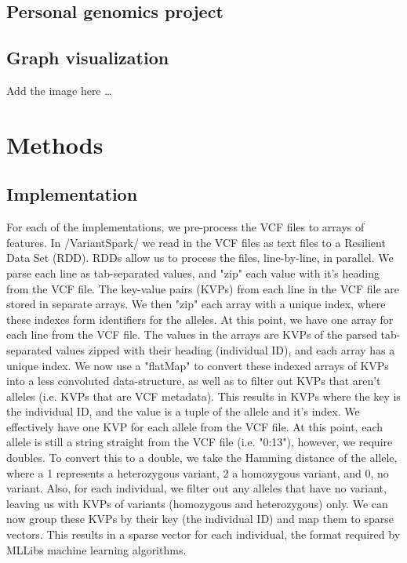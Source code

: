 \documentclass{bmcart}
\begin{document}
\subsection*{Personal genomics project}



\subsection*{Graph visualization}
Add the image here \ldots


\section*{Methods}
\subsection*{Implementation}
For each of the implementations, we pre-process the VCF files to arrays of features.
In /VariantSpark/ we read in the VCF files as text files to a Resilient Data Set (RDD). RDDs allow us to process the files, line-by-line, in parallel. We parse each line as tab-separated values, and "zip" each value with it's heading from the VCF file.
The key-value pairs (KVPs) from each line in the VCF file are stored in separate arrays. We then "zip" each array with a unique index, where these indexes form identifiers for the alleles.
At this point, we have one array for each line from the VCF file. The values in the arrays are KVPs of the parsed tab-separated values zipped with their heading (individual ID), and each array has a unique index.
We now use a "flatMap" to convert these indexed arrays of KVPs into a less convoluted data-structure, as well as to filter out KVPs that aren't alleles (i.e. KVPs that are VCF metadata).
This results in KVPs where the key is the individual ID, and the value is a tuple of the allele and it's index. We effectively have one KVP for each allele from the VCF file. At this point, each allele is still a string straight from the VCF file (i.e. "0:13"), however, we require doubles.
To convert this to a double, we take the Hamming distance of the allele, where a 1 represents a heterozygous variant, 2 a homozygous variant, and 0, no variant. Also, for each individual, we filter out any alleles that have no variant, leaving us with KVPs of variants (homozygous and heterozygous) only.
We can now group these KVPs by their key (the individual ID) and map them to sparse vectors. This results in a sparse vector for each individual, the format required by MLLibs machine learning algorithms.
\end{document}
